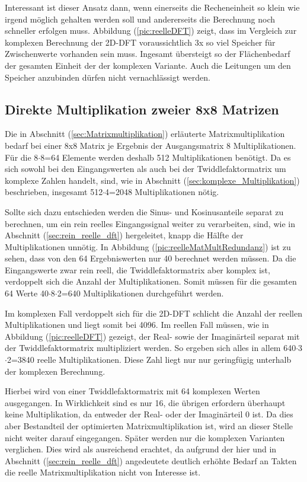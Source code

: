 Interessant ist dieser Ansatz dann, wenn einerseits die Recheneinheit so klein wie irgend möglich gehalten werden soll und andererseits die Berechnung noch schneller erfolgen muss.
Abbildung (\ref{pic:reelleDFT}) zeigt, dass im Vergleich zur komplexen Berechnung der 2D-DFT voraussichtlich 3x so viel Speicher für Zwischenwerte vorhanden sein muss.
Ingesamt übersteigt so der Flächenbedarf der gesamten Einheit der der komplexen Variante. Auch die Leitungen um den Speicher anzubinden dürfen nicht vernachlässigt werden.

 
\subsection{Direkte Multiplikation zweier 8x8 Matrizen}
Die in Abschnitt (\ref{sec:Matrixmultiplikation}) erläuterte Matrixmultiplikation bedarf bei einer 8x8 Matrix je Ergebnis der Ausgangsmatrix 8 Multiplikationen. Für
die 8$\cdot$8=64 Elemente werden deshalb 512 Multiplikationen benötigt. Da es sich sowohl bei den Eingangswerten als auch bei der Twiddlefaktormatrix um komplexe
Zahlen handelt, sind, wie in Abschnitt (\ref{sec:komplexe_Multiplikation}) beschrieben, insgesamt 512$\cdot$4=2048 Multiplikationen nötig.

Sollte sich dazu entschieden werden die Sinus- und Kosinusanteile separat zu berechnen, um ein rein reelles Eingangssignal weiter zu verarbeiten, sind, wie in Abschnitt
(\ref{sec:rein_reelle_dft}) hergeleitet, knapp die Hälfte der Multiplikationen unnötig. In Abbildung (\ref{pic:reelleMatMultRedundanz}) ist zu sehen, dass von den 64 
Ergebniswerten nur 40 berechnet werden müssen. Da die Eingangswerte zwar rein reell, die Twiddlefaktormatrix aber komplex ist, verdoppelt sich die Anzahl der Multiplikationen.
Somit müssen für die gesamten 64 Werte 40$\cdot$8$\cdot$2=640 Multiplikationen durchgeführt werden.

Im komplexen Fall verdoppelt sich für die 2D-DFT schlicht die Anzahl der reellen Multiplikationen und liegt somit bei 4096. Im reellen Fall müssen, wie in Abbildung 
(\ref{pic:reelleDFT}) gezeigt, der Real- sowie der Imaginärteil separat mit der Twiddlefaktormatrix multipliziert werden. So ergeben sich alles in allem 
640$\cdot$3$\cdot$2=3840 reelle Multiplikationen. Diese Zahl liegt nur nur geringfügig unterhalb der komplexen Berechnung.



Hierbei wird von einer Twiddlefaktormatrix mit 64 komplexen Werten ausgegangen. In Wirklichkeit sind es nur 16, die übrigen erfordern überhaupt keine Multiplikation, da 
entweder der Real- oder der Imaginärteil 0 ist. Da dies aber Bestandteil der optimierten Matrixmultiplikation ist, wird an dieser Stelle nicht weiter darauf eingegangen.
Später werden nur die komplexen Varianten verglichen. Dies wird als ausreichend erachtet, da aufgrund der hier und in Abschnitt (\ref{sec:rein_reelle_dft}) angedeutete deutlich 
erhöhte Bedarf an Takten die reelle Matrixmultiplikation nicht von Interesse ist. 


